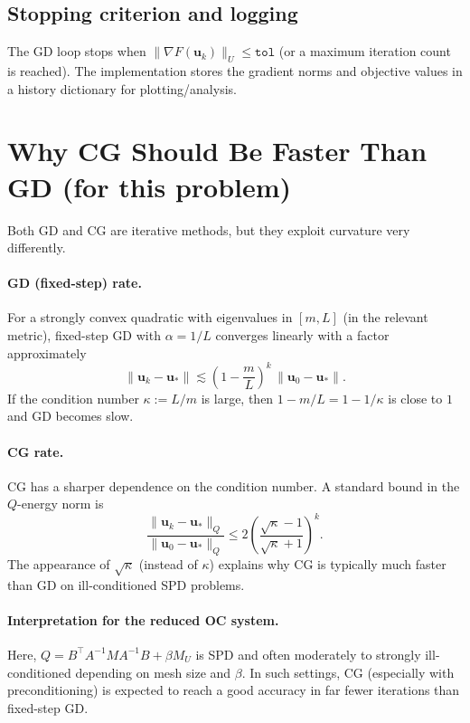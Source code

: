 \documentclass[11pt,a4paper]{article}
\begin{document}
\subsection{Stopping criterion and logging}
The GD loop stops when $\|\nabla F(\mathbf{u}_k)\|_U \le \texttt{tol}$ (or a maximum iteration count is reached). The implementation stores the gradient norms and objective values in a history dictionary for plotting/analysis.

\section{Why CG Should Be Faster Than GD (for this problem)}
Both GD and CG are iterative methods, but they exploit curvature very differently.

\paragraph{GD (fixed-step) rate.}
For a strongly convex quadratic with eigenvalues in $[m,L]$ (in the relevant metric), fixed-step GD with $\alpha=1/L$ converges linearly with a factor approximately
\begin{equation}
  \|\mathbf{u}_k-\mathbf{u}_*\| \lesssim \left(1-\frac{m}{L}\right)^k\,\|\mathbf{u}_0-\mathbf{u}_*\|.
\end{equation}
If the condition number $\kappa:=L/m$ is large, then $1-m/L = 1-1/\kappa$ is close to $1$ and GD becomes slow.

\paragraph{CG rate.}
CG has a sharper dependence on the condition number. A standard bound in the $Q$-energy norm is
\begin{equation}
  \frac{\|\mathbf{u}_k-\mathbf{u}_*\|_Q}{\|\mathbf{u}_0-\mathbf{u}_*\|_Q}
  \le
  2\left(\frac{\sqrt{\kappa}-1}{\sqrt{\kappa}+1}\right)^k.
\end{equation}
The appearance of $\sqrt{\kappa}$ (instead of $\kappa$) explains why CG is typically much faster than GD on ill-conditioned SPD problems.

\paragraph{Interpretation for the reduced OC system.}
Here, $Q = B^\top A^{-1}MA^{-1}B + \beta M_U$ is SPD and often moderately to strongly ill-conditioned depending on mesh size and $\beta$. In such settings, CG (especially with preconditioning) is expected to reach a good accuracy in far fewer iterations than fixed-step GD.
\end{document}
